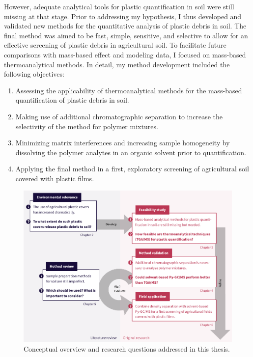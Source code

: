 However, adequate analytical tools for plastic quantification in soil were still missing at that stage. Prior to addressing my hypothesis, I thus developed and validated new methods for the quantitative analysis of plastic debris in soil. The final method was aimed to be fast, simple, sensitive, and selective to allow for an effective screening of plastic debris in agricultural soil. To facilitate future comparisons with mass-based effect and modeling data, I focused on mass-based thermoanalytical methods.
In detail, my method development included the following objectives:
\begin{enumerate}
	\item\label{en:thermoanalysis} Assessing the applicability of thermoanalytical methods for the mass-based quantification of plastic debris in soil.
	\item\label{en:chromatography} Making use of additional chromatographic separation to increase the selectivity of the method for polymer mixtures.
	\item\label{en:dissolution} Minimizing matrix interferences and increasing sample homogeneity by dissolving the polymer analytes in an organic solvent prior to quantification.
	\item\label{en:application} Applying the final method in a first, exploratory screening of agricultural soil covered with plastic films.
\end{enumerate}

\begin{figure}
	\centering
	\label{fig:thesis-overview}
	\includegraphics[width=\textwidth]{figures/thesis-overview}
	\caption{Conceptual overview and research questions addressed in this thesis.}
\end{figure}

